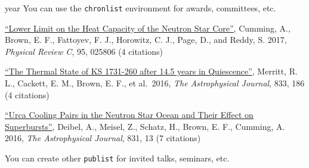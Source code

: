 \documentclass[11pt]{vitae}
\begin{document}
\begin{chronlist}
\item[year] You can use the \verb+chronlist+ environment for awards, committees, etc.
\end{chronlist}
\clearpage

\begin{publist}

\item \href{https://ui.adsabs.harvard.edu/#abs/2017PhRvC..95b5806C/abstract}{``Lower Limit on the Heat Capacity of the Neutron Star Core''}, Cumming, A., Brown, E. F., Fattoyev, F. J., Horowitz, C. J., Page, D., and Reddy, S. 2017, {\itshape Physical Review C}, 95, 025806 (4 citations)

\item \href{https://ui.adsabs.harvard.edu/#abs/2016ApJ...833..186M/abstract}{``The Thermal State of KS 1731-260 after 14.5 years in Quiescence''}, Merritt, R. L., Cackett, E. M., Brown, E. F., et al.\ 2016, {\itshape The Astrophysical Journal}, 833, 186 (4 citations)

\item \href{https://ui.adsabs.harvard.edu/#abs/2016ApJ...831...13D/abstract}{``Urca Cooling Pairs in the Neutron Star Ocean and Their Effect on Superbursts''}, Deibel, A., Meisel, Z., Schatz, H., Brown, E. F., Cumming, A. 2016, {\itshape The Astrophysical Journal}, 831, 13 (7 citations)

\end{publist}

You can create other \verb+publist+ for invited talks, seminars, etc.
\end{document}
